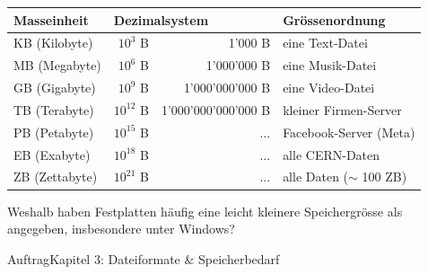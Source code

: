 \begin{frame}
\begin{table}[H]
	\footnotesize
	\centering
	\begin{tabular}{@{}l|rr|l@{}}
		\toprule
		\textbf{Masseinheit} & \multicolumn{2}{l|}{\textbf{Dezimalsystem}} & Grössenordnung                                   \\ \midrule
		KB (Kilobyte)        & $10^3$ B                               & 1'000 B             & eine Text-Datei            \\
		MB (Megabyte)        & $10^6$ B                                    & 1'000'000 B         & eine Musik-Datei           \\
		GB (Gigabyte)        & $10^9$ B                                    & 1'000'000'000 B     & eine Video-Datei           \\
		TB (Terabyte)        & $10^{12}$ B                                 & 1'000'000'000'000 B & kleiner Firmen-Server      \\
		PB (Petabyte)        & $10^{15}$ B                                 & ...                 & Facebook-Server (Meta)     \\
		EB (Exabyte)         & $10^{18}$ B                                 & ...                 & alle CERN-Daten            \\
		ZB (Zettabyte)       & $10^{21}$ B                                 & ...                 & alle Daten ($\sim$ 100 ZB) \\ \bottomrule
	\end{tabular}
\end{table}
\end{frame}

\begin{frame}
\begin{center}
Weshalb haben Festplatten häufig eine leicht kleinere Speichergrösse als angegeben, insbesondere unter Windows?
\end{center}
\end{frame}

\begin{frame}{Auftrag}{Kapitel 3: Dateiformate \& Speicherbedarf}
\\[3mm]
\\[3mm]
\end{frame}
